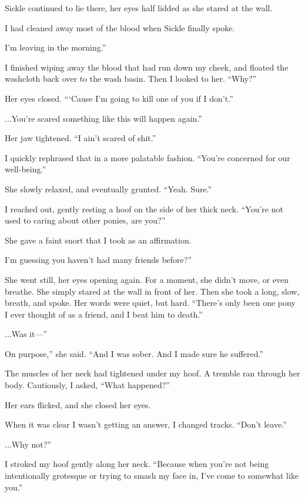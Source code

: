 Sickle continued to lie there, her eyes half lidded as she stared at the wall.

I had cleaned away most of the blood when Sickle finally spoke.

\leavevmode{}I’m leaving in the morning.”

I finished wiping away the blood that had run down my cheek, and floated the washcloth back over to the wash basin. Then I looked to her. “Why?”

Her eyes closed. “‘Cause I’m going to kill one of you if I don’t.”

\leavevmode{}...You’re scared something like this will happen again.”

Her jaw tightened. “I ain’t scared of shit.”

I quickly rephrased that in a more palatable fashion. “You’re concerned for our well-being.”

She slowly relaxed, and eventually grunted. “Yeah. Sure.”

I reached out, gently resting a hoof on the side of her thick neck. “You’re not used to caring about other ponies, are you?”

She gave a faint snort that I took as an affirmation.

\leavevmode{}I’m guessing you haven’t had many friends before?”

She went still, her eyes opening again. For a moment, she didn’t move, or even breathe. She simply stared at the wall in front of her. Then she took a long, slow, breath, and spoke. Her words were quiet, but hard. “There’s only been one pony I ever thought of as a friend, and I beat him to death.”

\leavevmode{}...Was it—”

\leavevmode{}On purpose,” she said. “And I was sober. And I made sure he suffered.”

The muscles of her neck had tightened under my hoof. A tremble ran through her body. Cautiously, I asked, “What happened?”

Her ears flicked, and she closed her eyes.

When it was clear I wasn’t getting an answer, I changed tracks. “Don’t leave.”

\leavevmode{}...Why not?”

I stroked my hoof gently along her neck. “Because when you’re not being intentionally grotesque or trying to smash my face in, I’ve come to somewhat like you.”

